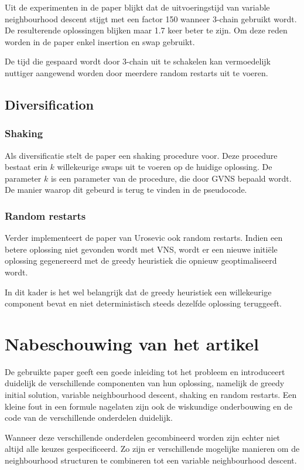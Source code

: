 \documentclass[pdftex,12pt,a4paper]{article}
\begin{document}
Uit de experimenten in de paper blijkt dat de uitvoeringstijd van variable neighbourhood descent stijgt met een factor 150 wanneer 3-chain gebruikt wordt. 
De resulterende oplossingen blijken maar 1.7 keer beter te zijn.
Om deze reden worden in de paper enkel insertion en swap gebruikt. 

De tijd die gespaard wordt door 3-chain uit te schakelen kan vermoedelijk nuttiger aangewend worden door meerdere random restarts uit te voeren.

\subsection{Diversification}
\subsubsection{Shaking}
Als diversificatie stelt de paper een shaking procedure voor.
Deze procedure bestaat erin $k$ willekeurige swaps uit te voeren op de huidige oplossing. 
De parameter $k$ is een parameter van de procedure, die door GVNS bepaald wordt. De manier waarop dit gebeurd is terug te vinden in de pseudocode.

\subsubsection{Random restarts}
Verder implementeert de paper van Urosevic\cite{Urosevic} ook random restarts. Indien een betere oplossing niet gevonden wordt met VNS, wordt er een nieuwe initi\"ele oplossing gegenereerd met de greedy heuristiek die opnieuw geoptimaliseerd wordt.

In dit kader is het wel belangrijk dat de greedy heuristiek een willekeurige component bevat en niet deterministisch steeds dezelfde oplossing teruggeeft.

\section{Nabeschouwing van het artikel}
De gebruikte paper geeft een goede inleiding tot het probleem en introduceert duidelijk de verschillende componenten van hun oplossing, namelijk de greedy initial solution, variable neighbourhood descent, shaking en random restarts.
Een kleine fout in een formule nagelaten zijn ook de wiskundige onderbouwing en de code van de verschillende onderdelen duidelijk.

Wanneer deze verschillende onderdelen gecombineerd worden zijn echter niet altijd alle keuzes gespecificeerd.
Zo zijn er verschillende mogelijke manieren om de neighbourhood structuren te combineren tot een variable neighbourhood descent.
\end{document}
